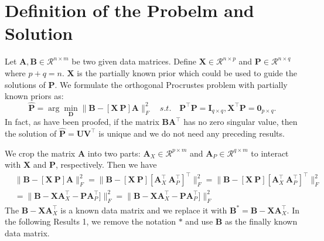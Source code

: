 \documentclass[titlepage,11pt,twoside]{article}
\begin{document}
\section{Definition of the Probelm and Solution}
Let $\mathbf{A},\mathbf{B}\in \mathcal{R}^{n\times m}$ be two given data matrices. Define $\mathbf{X}\in\mathcal{R}^{n\times p}$ and $\mathbf{P}\in\mathcal{R}^{n\times q}$ where $p+q=n$. $\mathbf{X}$ is the partially known prior which could be used to guide the solutions of $\mathbf{P}$. We formulate the orthogonal Procrustes problem with partially known priors as:
\begin{equation}
\mathbf{\hat{P}}=\arg\min_{\mathbf{D}}\|\mathbf{B}-[\mathbf{X}\ \mathbf{P}]\mathbf{A}\|_{F}^{2}
\quad
s.t.
\quad
\mathbf{P}^{\top}\mathbf{P} = \mathbf{I}_{q\times q}, \mathbf{X}^{\top}\mathbf{P} = \mathbf{0}_{p\times q}.
\end{equation} 
In fact, as have been proofed, if the matrix $\mathbf{\mathbf{B}\mathbf{A}^{\top}}$ has no zero singular value, then the solution of  
$\mathbf{\hat{P}} = \mathbf{U}\mathbf{V}^{\top}$ is unique and we do not need any preceding results.

We crop the matrix $\mathbf{A}$ into two parts: $\mathbf{A}_{X}\in\mathcal{R}^{p\times m}$ and $\mathbf{A}_{P}\in\mathcal{R}^{q\times m}$ to interact with $\mathbf{X}$ and $\mathbf{P}$, respectively. Then we have 
\begin{equation}
\begin{split}
&
\|\mathbf{B}-[\mathbf{X}\ \mathbf{P}]\mathbf{A}\|_{F}^{2}
=\|\mathbf{B}-[\mathbf{X}\ \mathbf{P}][\mathbf{A}_{X}^{\top}\ \mathbf{A}_{P}^{\top}]^{\top}\|_{F}^{2}
=\|\mathbf{B}-[\mathbf{X}\ \mathbf{P}][\mathbf{A}_{X}^{\top}\ \mathbf{A}_{P}^{\top}]^{\top}\|_{F}^{2}
\\
&
=\|\mathbf{B}-\mathbf{X}\mathbf{A}_{X}^{\top} - \mathbf{P}\mathbf{A}_{P}^{\top}]\|_{F}^{2}
=\|\mathbf{B}-\mathbf{X}\mathbf{A}_{X}^{\top} - \mathbf{P}\mathbf{A}_{P}^{\top}]\|_{F}^{2}
\end{split}
\end{equation}
The $\mathbf{B}-\mathbf{X}\mathbf{A}_{X}^{\top}$ is a known data matrix and we replace it with 
$\mathbf{B}^{*}=\mathbf{B}-\mathbf{X}\mathbf{A}_{X}^{\top}$. In the following Results 1, we remove the notation $*$ and use $\mathbf{B}$ as the finally known data matrix.
\end{document}
